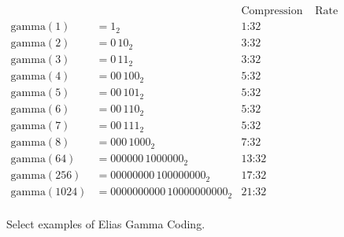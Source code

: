 \begin{figure}
	
	\centering
	\begin{align*}
						&		&\text{Compression}&\text{ Rate}\\
		\mathrm{gamma}(1) &= 1_2  &\text{1:32} \\
		\mathrm{gamma}(2) &= 0\,10_2 &\text{3:32} \\
		\mathrm{gamma}(3) &= 0\,11_2 &\text{3:32} \\
		\mathrm{gamma}(4) &= 00\,100_2 &\text{5:32} \\
		\mathrm{gamma}(5) &= 00\,101_2 &\text{5:32} \\
		\mathrm{gamma}(6) &= 00\,110_2 &\text{5:32} \\
		\mathrm{gamma}(7) &= 00\,111_2 &\text{5:32} \\
		\mathrm{gamma}(8) &= 000\,1000_2 &\text{7:32}\\
		\mathrm{gamma}(64) &= 000000\,1000000_2 &\text{13:32}\\
		\mathrm{gamma}(256) &= 00000000\,100000000_2 &\text{17:32} \\
		\mathrm{gamma}(1024) &= 0000000000\,10000000000_2 &\text{21:32} \\
	\end{align*}
	
	\caption{Select examples of Elias Gamma Coding.}
	\label{fig:bg-comp-gamma-ex}
\end{figure}